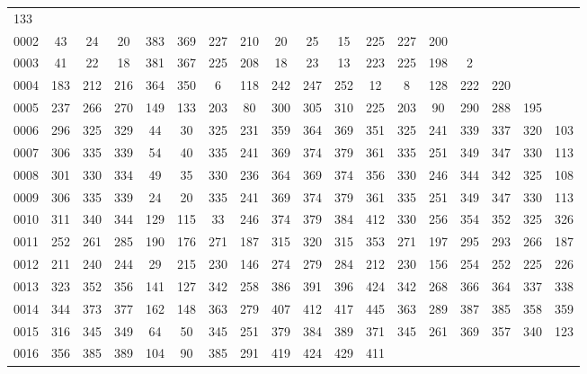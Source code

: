 \begin{table}[htbp]
\begin{center}
{\begin{tabular}{lccccccccccccccccc}
						   133 &  &  &  &  &  \\
0002 & 43 & 24 & 20 & 383 & 369 & 227 & 210 & 20 & 25 & 15 & 225 & 227 &
						       200 &  &  &  &  \\
0003 & 41 & 22 & 18 & 381 & 367 & 225 & 208 & 18 & 23 & 13 & 223 & 225 &
						       198 & 2 &  &  &  \\
0004 & 183 & 212 & 216 & 364 & 350 & 6 & 118 & 242 & 247 & 252 & 12 & 8
						   & 128 & 222 & 220 &
								   &  \\
0005 & 237 & 266 & 270 & 149 & 133 & 203 & 80 & 300 & 305 & 310 & 225 &
						   203 & 90 & 290 & 288
							       & 195 &  \\
0006 & 296 & 325 & 329 & 44 & 30 & 325 & 231 & 359 & 364 & 369 & 351 &
						   325 & 241 & 339 & 337
							       & 320 &
								       103 \\
0007 & 306 & 335 & 339 & 54 & 40 & 335 & 241 & 369 & 374 & 379 & 361 &
						   335 & 251 & 349 & 347
							       & 330 &
								       113 \\
0008 & 301 & 330 & 334 & 49 & 35 & 330 & 236 & 364 & 369 & 374 & 356 &
						   330 & 246 & 344 & 342
							       & 325 &
								       108 \\
0009 & 306 & 335 & 339 & 24 & 20 & 335 & 241 & 369 & 374 & 379 & 361 &
						   335 & 251 & 349 & 347
							       & 330 &
								       113 \\
0010 & 311 & 340 & 344 & 129 & 115 & 33 & 246 & 374 & 379 & 384 & 412 &
						   330 & 256 & 354 & 352
							       & 325 &
								       326 \\
0011 & 252 & 261 & 285 & 190 & 176 & 271 & 187 & 315 & 320 & 315 & 353 &
						   271 & 197 & 295 & 293
							       & 266 &
								       187 \\
0012 & 211 & 240 & 244 & 29 & 215 & 230 & 146 & 274 & 279 & 284 & 212 &
						   230 & 156 & 254 & 252
							       & 225 &
								       226 \\
0013 & 323 & 352 & 356 & 141 & 127 & 342 & 258 & 386 & 391 & 396 & 424 &
						   342 & 268 & 366 & 364
							       & 337 &
								       338 \\
0014 & 344 & 373 & 377 & 162 & 148 & 363 & 279 & 407 & 412 & 417 & 445 &
						   363 & 289 & 387 & 385
							       & 358 &
								       359 \\
0015 & 316 & 345 & 349 & 64 & 50 & 345 & 251 & 379 & 384 & 389 & 371 &
						   345 & 261 & 369 & 357
							       & 340 &
								       123 \\
0016 & 356 & 385 & 389 & 104 & 90 & 385 & 291 & 419 & 424 & 429 & 411 &

\end{tabular}}
\end{center}
\end{table}
